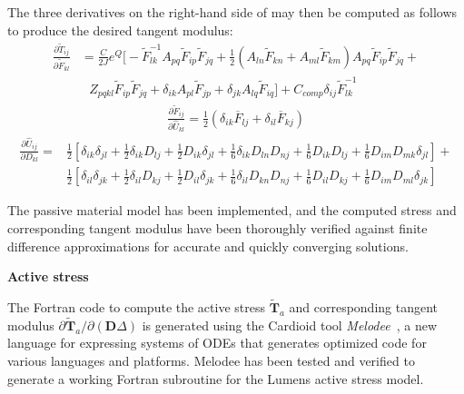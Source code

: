 The three derivatives on the right-hand side of  may then be computed as follows to produce the desired tangent modulus:
\begin{equation}
\begin{aligned}
\frac{\partial \tilde{T}_{ij}}{\partial \tilde{F}_{kl}} &= \frac{C}{2J}e^{Q} \Bigg[-\tilde{F}^{-1}_{lk}A_{pq}\tilde{F}_{ip}\tilde{F}_{jq} + \frac{1}{2}(A_{ln}\tilde{F}_{kn} + A_{ml}\tilde{F}_{km})A_{pq}\tilde{F}_{ip}\tilde{F}_{jq} + \\
&\text{\ \ \ }Z_{pqkl}\tilde{F}_{ip}\tilde{F}_{jq} + \delta_{ik}A_{pl}\tilde{F}_{jp} + \delta_{jk}A_{lq}\tilde{F}_{iq}\Bigg] + C_{comp}\delta_{ij}\tilde{F}^{-1}_{lk}
\end{aligned}
\end{equation}
\begin{align}
\frac{\partial \tilde{F}_{ij}}{\partial \hat{U}_{kl}} = \frac{1}{2}\left(\delta_{ik}\overline{F}_{lj} + \delta_{il}\overline{F}_{kj}\right)
\end{align}
\begin{equation}
\begin{aligned}
\frac{\partial \hat{U}_{ij}}{\partial D_{kl}} = &\frac{1}{2}\left[\delta_{ik}\delta_{jl} + \frac{1}{2}\delta_{ik}D_{lj} + \frac{1}{2}D_{ik}\delta_{jl} + \frac{1}{6}\delta_{ik}D_{ln}D_{nj} + \frac{1}{6}D_{ik}D_{lj} + \frac{1}{6}D_{im}D_{mk}\delta_{jl}\right] + \\
&\frac{1}{2}\left[\delta_{il}\delta_{jk} + \frac{1}{2}\delta_{il}D_{kj} + \frac{1}{2}D_{il}\delta_{jk} + \frac{1}{6}\delta_{il}D_{kn}D_{nj} + \frac{1}{6}D_{il}D_{kj} + \frac{1}{6}D_{im}D_{ml}\delta_{jk}\right]
\end{aligned}
\end{equation}

The passive material model has been implemented, and the computed stress and corresponding tangent modulus have been thoroughly verified against finite difference approximations for accurate and quickly converging solutions.

\textbf{Active stress}

The Fortran code to compute the active stress $\tilde{\bm{T}}_a$ and corresponding tangent modulus ${\partial \tilde{\bm{T}}_a}/{\partial (\bm{D}\Delta)}$ is generated using the Cardioid tool \textit{Melodee}~\cite{melodee}, a new language for expressing systems of ODEs that generates optimized code for various languages and platforms. Melodee has been tested and verified to generate a working Fortran subroutine for the Lumens active stress model.

